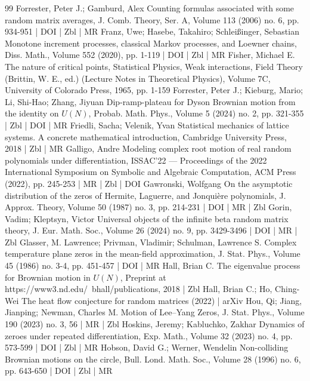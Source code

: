 \begin{thebibliography}{99}
Forrester, Peter J.; Gamburd, Alex Counting formulas associated with some random matrix averages, J. Comb. Theory, Ser. A, Volume 113 (2006) no. 6, pp. 934-951 | DOI | Zbl | MR
Franz, Uwe; Hasebe, Takahiro; Schleißinger, Sebastian Monotone increment processes, classical Markov processes, and Loewner chains, Diss. Math., Volume 552 (2020), pp. 1-119 | DOI | Zbl | MR
Fisher, Michael E. The nature of critical points, Statistical Physics, Weak interactions, Field Theory (Brittin, W. E., ed.) (Lecture Notes in Theoretical Physics), Volume 7C, University of Colorado Press, 1965, pp. 1-159
Forrester, Peter J.; Kieburg, Mario; Li, Shi-Hao; Zhang, Jiyuan Dip-ramp-plateau for Dyson Brownian motion from the identity on ${U}({N})$, Probab. Math. Phys., Volume 5 (2024) no. 2, pp. 321-355 | Zbl | DOI | MR
Friedli, Sacha; Velenik, Yvan Statistical mechanics of lattice systems. A concrete mathematical introduction, Cambridge University Press, 2018 | Zbl | MR
Galligo, Andre Modeling complex root motion of real random polynomials under differentiation, ISSAC’22 — Proceedings of the 2022 International Symposium on Symbolic and Algebraic Computation, ACM Press (2022), pp. 245-253 | MR | Zbl | DOI
Gawronski, Wolfgang On the asymptotic distribution of the zeros of Hermite, Laguerre, and Jonquière polynomials, J. Approx. Theory, Volume 50 (1987) no. 3, pp. 214-231 | DOI | MR | Zbl
Gorin, Vadim; Kleptsyn, Victor Universal objects of the infinite beta random matrix theory, J. Eur. Math. Soc., Volume 26 (2024) no. 9, pp. 3429-3496 | DOI | MR | Zbl
Glasser, M. Lawrence; Privman, Vladimir; Schulman, Lawrence S. Complex temperature plane zeros in the mean-field approximation, J. Stat. Phys., Volume 45 (1986) no. 3-4, pp. 451-457 | DOI | MR
Hall, Brian C. The eigenvalue process for Brownian motion in ${U}({N})$, Preprint at https://www3.nd.edu/~bhall/publications, 2018 | Zbl
Hall, Brian C.; Ho, Ching-Wei The heat flow conjecture for random matrices (2022) | arXiv
Hou, Qi; Jiang, Jianping; Newman, Charles M. Motion of Lee–Yang Zeros, J. Stat. Phys., Volume 190 (2023) no. 3, 56 | MR | Zbl
Hoskins, Jeremy; Kabluchko, Zakhar Dynamics of zeroes under repeated differentiation, Exp. Math., Volume 32 (2023) no. 4, pp. 573-599 | DOI | Zbl | MR
Hobson, David G.; Werner, Wendelin Non-colliding Brownian motions on the circle, Bull. Lond. Math. Soc., Volume 28 (1996) no. 6, pp. 643-650 | DOI | Zbl | MR

\end{thebibliography}
